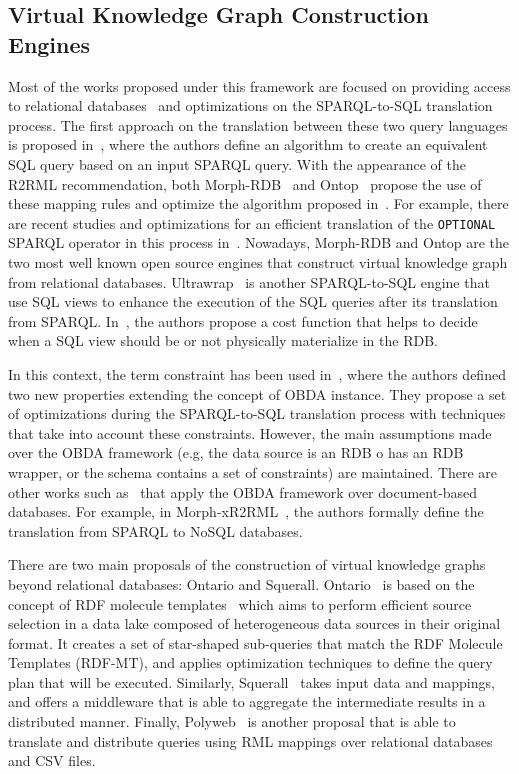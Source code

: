 \subsection{Virtual Knowledge Graph Construction Engines}
Most of the works proposed under this framework are focused on providing access to relational databases~\citep{priyatna2014formalisation,calvanese2017ontop,sequeda2013ultrawrap} and optimizations on the  SPARQL-to-SQL translation process. The first approach on the translation between these two query languages is proposed in~\citep{chebotko2009semantics}, where the authors define an algorithm to create an equivalent SQL query based on an input SPARQL query. With the appearance of the R2RML recommendation, both Morph-RDB~\citep{priyatna2014formalisation} and Ontop~\citep{calvanese2017ontop} propose the use of these mapping rules and optimize the algorithm proposed in~\citep{chebotko2009semantics}. For example, there are recent studies and optimizations for an efficient translation of the \texttt{OPTIONAL} SPARQL operator in this process in~\citep{xiao2018efficient}. Nowadays, Morph-RDB and Ontop are the two most well known open source engines that construct virtual knowledge graph from relational databases. Ultrawrap~\citep{sequeda2013ultrawrap,sequeda2014obda} is another SPARQL-to-SQL engine that use SQL views to enhance the execution of the SQL queries after its translation from SPARQL. In~\citep{sequeda2014obda}, the authors propose a cost function that helps to decide when a SQL view should be or not physically materialize in the RDB.

In this context, the term constraint has been used in~\citep{hovland2016obda}, where the authors defined two new properties extending the concept of OBDA instance. They propose a set of optimizations during the SPARQL-to-SQL translation process with techniques that take into account these constraints. However, the main assumptions made over the OBDA framework (e.g, the data source is an RDB o has an RDB wrapper, or the schema contains a set of constraints) are maintained. There are other works such as~\citep{michel2015translation,botoeva2019ontology} that apply the OBDA framework over document-based databases. For example, in Morph-xR2RML~\citep{michel2015translation}, the authors formally define the translation from SPARQL to NoSQL databases.

There are two main proposals of the construction of virtual knowledge graphs beyond relational databases: Ontario and Squerall. Ontario~\citep{endris2019ontario} is based on the concept of RDF molecule templates~\citep{endris2017mulder} which aims to perform efficient source selection in a data lake composed of heterogeneous data sources in their original format. It creates a set of star-shaped sub-queries that match the RDF Molecule Templates (RDF-MT), and applies optimization techniques to define the query plan that will be executed. Similarly, Squerall~\citep{mami2019querying} takes input data and mappings, and offers a middleware that is able to aggregate the intermediate results in a distributed manner. Finally, Polyweb~\citep{khan2019one} is another proposal that is able to translate and distribute queries using RML mappings over relational databases and CSV files.


